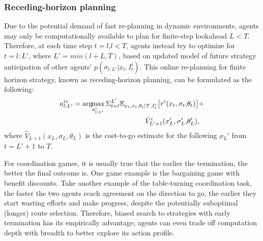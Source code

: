\documentclass[letterpaper, 10 pt, conference]{ieeeconf}  %
\newcommand{\argmax}{\arg\!\!\max}
\begin{document}
\subsubsection{Receding-horizon planning}\label{sec:receding}
Due to the potential demand of fast re-planning in dynamic environments, agents may only be computationally available to plan for finite-step lookahead $L<T$. Therefore, at each time step $t=l$,$l<T$, agents instead try to optimize for $t=l:L'$, where $L'=min(l+L,T)$, based on updated model of future strategy 
anticipation of other agents' $p(\sigma_{l:L'}|x_l,I^i_l)$. This online re-planning 
for finite horizon strategy, known as receding-horizon planning, can be formulated as the following:
\begin{equation}
  \begin{aligned}
  a^{i*}_{l:L'} = \argmax_{a^i_{l:L'}} 
  \Sigma_{t=l}^{L'} 
  \mathbb{E}_{x_t,\sigma_{t},\theta_t|\mathcal{T},I^i_t} \big{[}
    r^i(x_t,\sigma_t,&\theta_t)\big{]}+ \\
    \hat{V}^i_{L'+1}(x_L',\sigma_L',&\theta_L'), 
  \end{aligned}
  \end{equation}
where $\hat{V}_{L+1}(x_L,\sigma_L,\theta_L)$ is the cost-to-go estimate for the following $\sigma_L'$ from $t=L'+1$ to $T$.

For coordination games, it is usually true that the earlier the termination, 
the better the final outcome is. One game example is the bargaining game with 
benefit discounts. 
Take another example of the table-turning coordination task, the faster the two agents reach 
agreement on the direction to go, the earlier they start wasting efforts and make progress, despite the 
potentially suboptimal (longer) route selection. Therefore, biased search to 
strategies with early 
termination has its empirically advantage; agents can even trade off 
computation depth with breadth to better explore its action profile. 
\end{document}

